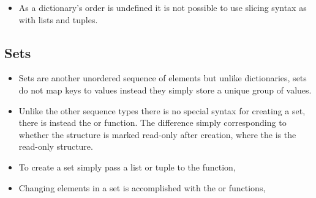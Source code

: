 \documentclass[letterpaper,10pt,english,openany]{sphinxmanual}
\begin{document}
\begin{sphinxVerbatim}[commandchars=\\\{\}]
 \PYG{p}{[}\PYG{p}{]}   
   
\end{sphinxVerbatim}
\begin{itemize}
\item {} 
As a dictionary’s order is undefined it is not possible to use
slicing syntax as with lists and tuples.

\end{itemize}


\subsection{Sets}
\label{\detokenize{introduction_to_python/more_sequence_types:sets}}\begin{itemize}
\item {} 
Sets are another unordered sequence of elements but unlike
dictionaries, sets do not map keys to values instead they simply
store a unique group of values.

\item {} 
Unlike the other sequence types there is no special syntax for
creating a set, there is instead the  or 
function. The difference simply corresponding to whether the
structure is marked read-only after creation, where the 
is the read-only structure.

\item {} 
To create a set simply pass a list or tuple to the 
function,

\item {} 
Changing elements in a set is accomplished with the  or
 functions,

\end{itemize}

\begin{sphinxVerbatim}[commandchars=\\\{\}]
  \PYG{p}{[}\PYG{p}{]}
\end{sphinxVerbatim}
\end{document}
